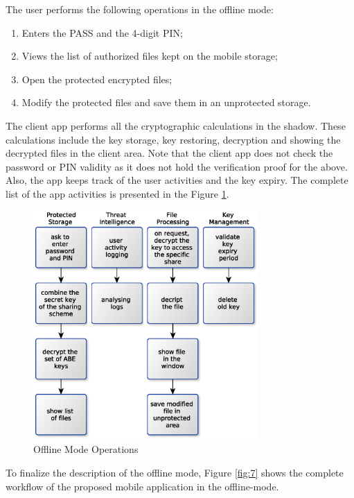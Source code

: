 \documentclass[twocolumn]{svjour3}          	%
\begin{document}
The user performs the following operations in the offline mode:

\begin{enumerate}
	\item Enters the PASS and the 4-digit PIN;
	\item Views the list of authorized files kept on the mobile storage;
	\item Open the protected encrypted files;
	\item Modify the protected files and save them in an unprotected storage.
\end{enumerate}

The client app performs all the cryptographic calculations in the shadow. These calculations include the key storage, key restoring, decryption and showing the decrypted files in the client area. Note that the client app does not check the password or PIN validity as it does not hold the verification proof for the above. Also, the app keeps track of the user activities and the key expiry. The complete list of the app activities is presented in the Figure \ref{fig:6}.

\begin{figure}[h!]
	\centering
	\includegraphics[width=8.6cm]{figures/offlinemodeoperations.eps}
	\caption{Offline Mode Operations}
	\label{fig:6}
\end{figure}

To finalize the description of the offline mode, Figure \ref{fig:7} shows the complete workflow of the proposed mobile application in the offline-mode.
\end{document}

